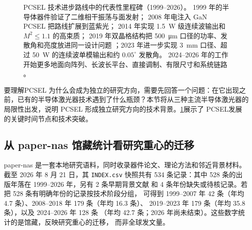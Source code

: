 \begin{figure}[htbp]
  \centering
  
  \caption{PCSEL 技术进步路线中的代表性里程碑（1999–2026）。
  1999 年的半导体器件验证了二维相干振荡与面发射\cite{imada1999}；
  2008 年电注入 GaN PCSEL 把路线扩展到蓝紫光\cite{matsubara2008}；
  2014 年实现 \SI{1.5}{W} 级连续波输出和 $M^2\leq1.1$ 的高束质\cite{hirose2014}；
  2019 年双晶格结构把 \SI{500}{\micro\meter} 口径的功率、发散角和亮度放进同一设计问题
  \cite{yoshida2019}；2023 年进一步实现 \SI{3}{mm} 口径、超过 \SI{50}{W}
  的连续波单模输出和约 $0.05^\circ$ 发散角\cite{yoshida2023}。
  2024–2026 年的工作开始更多地面向阵列、长波长平台、直接调制、有限尺寸和系统链路
  \cite{noda2024pcselreview,li2024laterallycoupledpcsel,zhou2024nside1550pcsel,
  inoue2025fmpcsel,wang2025finitesizepcsel}。}
  \label{fig:ch01_development_timeline}
\end{figure}

要理解PCSEL 为什么会成为独立的研究方向，需要先回答一个问题：在它出现之前，已有的半导体激光器技术遇到了什么瓶颈？本节将从三种主流半导体激光器的局限性出发，说明 PCSEL 形成独立研究方向的技术背景。\cref{fig:ch01_development_timeline}展示了 PCSEL发展的关键时间节点和技术突破。

\subsection{从 paper-nas 馆藏统计看研究重心的迁移}
\label{sec:papernas-progress-roadmap}

paper-nas 是一套本地研究语料，同时收录器件论文、理论方法和邻近背景材料。截至 2026 年 8 月 21 日，其 \texttt{INDEX.csv}
快照共有 534 条记录：其中 528 条的出版年落在 1999–2026 年，另有 2 条早期背景文献
和 4 条年份缺失或待核记录。若把 528 条有明确年份的记录按技术阶段分组，
可得到 1999–2007 年 42 条（年均 4.7 条）、2008–2018 年 179 条（年均 16.3 条）、
2019–2023 年 179 条（年均 35.8 条），以及 2024–2026 年 128 条
（年均 42.7 条；2026 年尚未结束）。这些数字统计的是馆藏，反映研究重心的迁移，
而非全球发文量。

